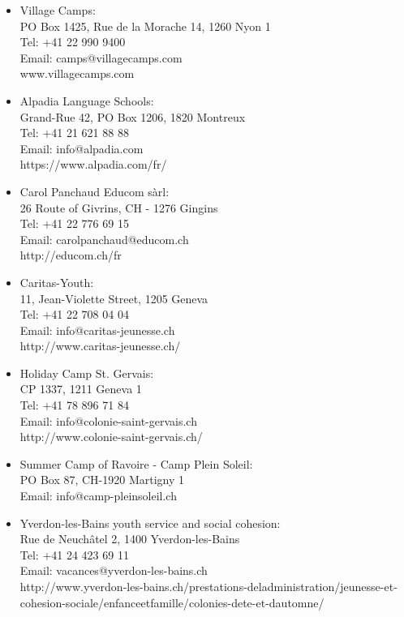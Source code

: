 \begin{itemize}
\vspace{4pt}
\item Village Camps: \\
PO Box 1425, Rue de la Morache 14, 1260 Nyon 1 \\
Tel: +41 22 990 9400 \\
Email: camps@villagecamps.com \\
www.villagecamps.com

\vspace{4pt}
\item Alpadia Language Schools: \\
Grand-Rue 42, PO Box 1206, 1820 Montreux\\
Tel: +41 21 621 88 88\\
Email: info@alpadia.com\\
https://www.alpadia.com/fr/ 

\vspace{4pt}
\item Carol Panchaud Educom sàrl: \\
26 Route of Givrins, CH - 1276 Gingins\\
Tel: +41 22 776 69 15 \\
Email: carolpanchaud@educom.ch \\
http://educom.ch/fr

\vspace{4pt}
\item Caritas-Youth: \\
11, Jean-Violette Street, 1205 Geneva\\
Tel: +41 22 708 04 04\\
Email: info@caritas-jeunesse.ch\\
http://www.caritas-jeunesse.ch/

\vspace{4pt}
\item Holiday Camp St. Gervais: \\
CP 1337, 1211 Geneva 1\\
Tel: +41 78 896 71 84\\
Email: info@colonie-saint-gervais.ch\\
http://www.colonie-saint-gervais.ch/

\vspace{4pt}
\item Summer Camp of Ravoire - Camp Plein Soleil: \\
PO Box 87, CH-1920 Martigny 1\\
Email: info@camp-pleinsoleil.ch

\vspace{4pt}
\item Yverdon-les-Bains youth service and social cohesion: \\
Rue de Neuchâtel 2, 1400 Yverdon-les-Bains\\
Tel: +41 24 423 69 11\\
Email: vacances@yverdon-les-bains.ch\\
http://www.yverdon-les-bains.ch/prestations-deladministration/jeunesse-et-cohesion-sociale/enfanceetfamille/colonies-dete-et-dautomne/


\end{itemize}
